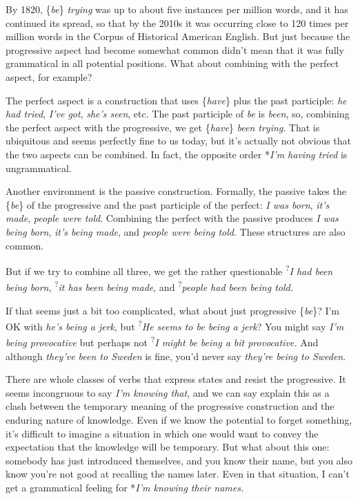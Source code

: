 By 1820, \{\textit{be}\} \textit{trying} was up to about five instances per million words, and it has continued its spread, so that by the 2010s it was occurring close to 120 times per million words in the Corpus of Historical American English. But just because the progressive aspect had become somewhat common didn't mean that it was fully grammatical in all potential positions. What about combining with the perfect aspect, for example?

The perfect aspect is a construction that uses \{\textit{have}\} plus the past participle: \textit{he had tried}, \textit{I've got}, \textit{she's seen}, etc. The past participle of \textit{be} is \textit{been}, so, combining the perfect aspect with the progressive, we get \{\textit{have}\} \textit{been trying}. That is ubiquitous and seems perfectly fine to us today, but it's actually not obvious that the two aspects can be combined. In fact, the opposite order *\textit{I'm having tried} is ungrammatical.

Another environment is the passive construction. Formally, the passive takes the \{\textit{be}\} of the progressive and the past participle of the perfect: \textit{I was born}, \textit{it's made}, \textit{people were told}. Combining the perfect with the passive produces \textit{I was being born}, \textit{it's being made}, and \textit{people were being told}. These structures are also common.

But if we try to combine all three, we get the rather questionable \textsuperscript{?}\textit{I had been being born}, \textsuperscript{?}\textit{it has been being made}, and \textsuperscript{?}\textit{people had been being told.}

If that seems just a bit too complicated, what about just progressive \{\textit{be}\}? I'm OK with \textit{he's being a jerk}, but \textsuperscript{?}\textit{He seems to be being a jerk}? You might say \textit{I'm being provocative} but perhaps not \textsuperscript{?}\textit{I might be being a bit provocative.} And although \textit{they've been to Sweden} is fine, you'd never say \textit{they're being to Sweden}.

There are whole classes of verbs that express states and resist the progressive. It seems incongruous to say \textit{I'm knowing that}, and we can say explain this as a clash between the temporary meaning of the progressive construction and the enduring nature of knowledge. Even if we know the potential to forget something, it's difficult to imagine a situation in which one would want to convey the expectation that the knowledge will be temporary. But what about this one: somebody has just introduced themselves, and you know their name, but you also know you're not good at recalling the names later. Even in that situation, I can't get a grammatical feeling for *\textit{I'm knowing their names.}

